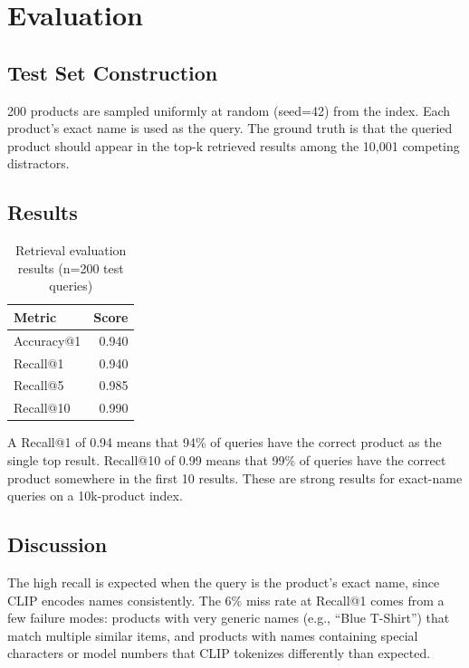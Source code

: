 \documentclass[11pt]{article}
\begin{document}
\section{Evaluation}

\subsection{Test Set Construction}
200 products are sampled uniformly at random (seed=42) from the index. Each product's
exact name is used as the query. The ground truth is that the queried product should appear
in the top-k retrieved results among the 10,001 competing distractors.

\subsection{Results}

\begin{table}[H]
\centering
\begin{tabular}{lr}
\toprule
\textbf{Metric} & \textbf{Score} \\
\midrule
Accuracy@1  & 0.940 \\
Recall@1    & 0.940 \\
Recall@5    & 0.985 \\
Recall@10   & 0.990 \\
\bottomrule
\end{tabular}
\caption{Retrieval evaluation results (n=200 test queries)}
\end{table}

A Recall@1 of 0.94 means that 94\% of queries have the correct product as the single
top result. Recall@10 of 0.99 means that 99\% of queries have the correct product
somewhere in the first 10 results. These are strong results for exact-name queries on
a 10k-product index.

\subsection{Discussion}
The high recall is expected when the query is the product's exact name, since CLIP encodes
names consistently. The 6\% miss rate at Recall@1 comes from a few failure modes: products
with very generic names (e.g., ``Blue T-Shirt'') that match multiple similar items, and
products with names containing special characters or model numbers that CLIP tokenizes
differently than expected.
\end{document}
